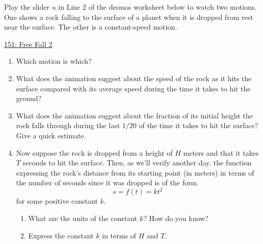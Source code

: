 \documentclass{ximera}
\begin{document}
\begin{question} \label{Qd90t90ette}
Play the slider $u$ in Line 2 of the desmos worksheet below to watch two motions. One shows a rock falling to the surface of a planet when it is dropped from rest near the surface. The other is a constant-speed motion.

\begin{onlineOnly}
    \begin{center}
\end{center}
\end{onlineOnly}

\href{https://www.desmos.com/calculator/dmlrxahkld}{151: Free Fall 2}

\begin{enumerate}

\item Which motion is which?

\item What does the animation suggest about the speed of the rock as it hits the surface compared with its average speed during the time it takes to hit the ground?

\item What does the animation suggest about the fraction of its initial height the rock falls through during the last $1/20$ of the time it takes to hit the surface? Give a quick estimate.

\item Now suppose the rock is dropped from a height of $H$ meters and that it takes $T$ seconds to hit the surface. Then, as we'll verify another day, the function expressing the rock's distance from its starting point (in meters) in terms of the number of seconds since it was dropped is of the form
\[
      s = f(t) = kt^2 \
\]  
for some positive constant $k$.

\begin{enumerate}

\item What are the units of the constant $k$? How do you know?

\item Express the constant $k$ in terms of $H$ and $T$. 





\end{enumerate}
\end{enumerate}
\end{question}
\end{document}
